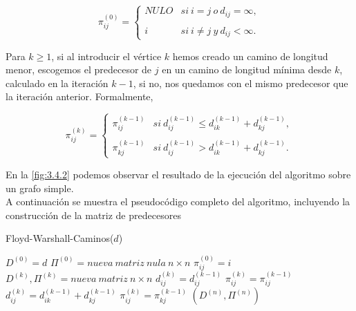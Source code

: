 $$\pi_{ij}^{(0)}= \left\{ \begin{array}{lcc}
	NULO &   si\ i=j\ o\ d_{ij}=\infty, \\
	\\ i & si\ i\neq j\ y\ d_{ij}<\infty.
\end{array}
\right.$$

Para $k\geq 1$, si al introducir el vértice $k$ hemos creado un camino de longitud menor, escogemos el predecesor de $j$ en un camino de longitud mínima desde $k$, calculado en la iteración $k-1$, si no, nos quedamos con el mismo predecesor que la iteración anterior. Formalmente, 

$$\pi_{ij}^{(k)}= \left\{ \begin{array}{lcc}
	\pi_{ij}^{(k-1)} &   si\ d_{ij}^{(k-1)}\leq d_{ik}^{(k-1)}+d_{kj}^{(k-1)}, \\
	\\ \pi_{kj}^{(k-1)} &   si\ d_{ij}^{(k-1)}> d_{ik}^{(k-1)}+d_{kj}^{(k-1)}.
\end{array}
\right.$$

En la \autoref{fig:3.4.2} podemos observar el resultado de la ejecución del algoritmo sobre un grafo simple. \\

A continuación se muestra el pseudocódigo completo del algoritmo, incluyendo la construcción de la matriz de predecesores

\begin{breakablealgorithm}
	\caption{Floyd-Warshall-Caminos($d$)}
	\begin{algorithmic}[1]
		\State $D^{(0)}=d$
		\State $\Pi^{(0)}=nueva\ matriz\ nula\ n\times n$
			\State $\pi_{ij}^{(0)}=i$
		\EndFor
			\State $D^{(k)},\Pi^{(k)}=nueva\ matriz\ n\times n$
						\State $d_{ij}^{(k)}=d_{ij}^{(k-1)}$
						\State $\pi_{ij}^{(k)}=\pi_{ij}^{(k-1)}$
					\Else
						\State $d_{ij}^{(k)}=d_{ik}^{(k-1)}+d_{kj}^{(k-1)}$
						\State $\pi_{ij}^{(k)}=\pi_{kj}^{(k-1)}$
					\EndIf
				\EndFor
			\EndFor
		\EndFor
		\Return $(D^{(n)},\Pi^{(n)})$
	\end{algorithmic}
\end{breakablealgorithm}

